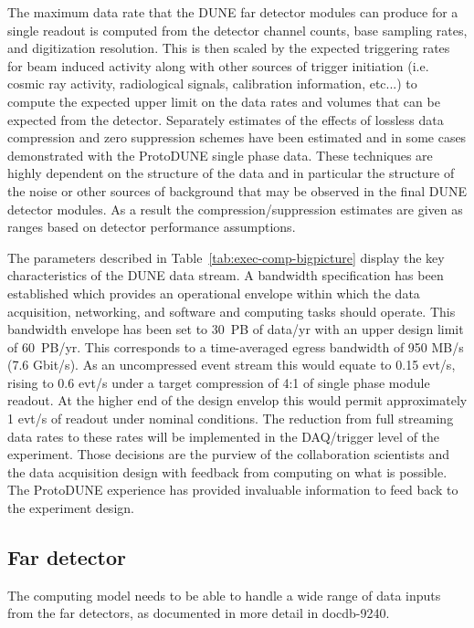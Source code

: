The maximum data rate that the DUNE far detector modules can produce for a single readout is computed from the detector channel counts, base sampling rates, and digitization resolution.  This is then scaled by the expected triggering rates for beam induced activity along with other sources of trigger initiation (i.e. cosmic ray activity, radiological signals, calibration information, etc...) to compute the expected upper limit on the data rates and volumes that can be expected from the detector.  Separately estimates of the effects of lossless data compression and zero suppression schemes have been estimated and in some cases demonstrated with the ProtoDUNE single phase data.  These techniques are highly dependent  on the structure of the data and in particular the structure of the noise or other sources of background that may be observed in the final DUNE detector modules.  As a result the compression/suppression estimates are given as ranges based on detector performance assumptions.

The parameters described in Table~\ref{tab:exec-comp-bigpicture} display the key characteristics of the DUNE data stream.  A bandwidth specification has been established which provides an operational envelope within which the data acquisition, networking, and software and computing tasks should  operate. This bandwidth envelope has been set to  30~PB of data/yr with an upper design limit of 60~PB/yr.  This corresponds to a time-averaged egress bandwidth  of 950 MB/s (7.6 Gbit/s).  As an uncompressed event stream this would equate to 0.15 evt/s, rising to 0.6 evt/s under a target compression of 4:1 of single phase module readout.  At the higher end of the design envelop this would permit approximately 1 evt/s of readout under nominal conditions.  The reduction from full streaming data rates to these rates will be implemented in the DAQ/trigger level of the experiment.
Those decisions are the purview of the collaboration scientists and the data acquisition design with feedback from computing on what is possible.  The ProtoDUNE experience has provided invaluable information to feed back to the experiment design.

\subsection{Far detector}

The computing model needs to be able to handle a wide range of data inputs from the far detectors, as documented in more detail in docdb-9240.

